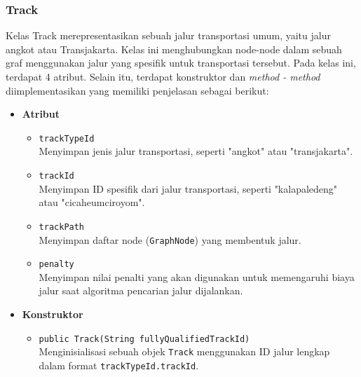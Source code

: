 \subsubsection{Track}
\label{subss:track}
Kelas Track merepresentasikan sebuah jalur transportasi umum, yaitu jalur angkot atau Transjakarta. Kelas ini menghubungkan node-node dalam sebuah graf menggunakan jalur yang spesifik untuk transportasi tersebut. Pada kelas ini, terdapat 4 atribut. Selain itu, terdapat konstruktor dan \textit{method - method} diimplementasikan yang memiliki penjelasan sebagai berikut:
\begin{itemize}
    \item \textbf{Atribut}
    \begin{itemize}
        \item \texttt{trackTypeId}
        \\ Menyimpan jenis jalur transportasi, seperti "angkot" atau "transjakarta".
        \item \texttt{trackId}
        \\ Menyimpan ID spesifik dari jalur transportasi, seperti "kalapaledeng" atau "cicaheumciroyom".
        \item \texttt{trackPath}
        \\ Menyimpan daftar node (\texttt{GraphNode}) yang membentuk jalur.
        \item \texttt{penalty}
        \\ Menyimpan nilai penalti yang akan digunakan untuk memengaruhi biaya jalur saat algoritma pencarian jalur dijalankan.
    \end{itemize}

    \item \textbf{Konstruktor}
    \begin{itemize}
        \item \texttt{public Track(String fullyQualifiedTrackId)}
        \\ Menginisialisasi sebuah objek \texttt{Track} menggunakan ID jalur lengkap dalam format \texttt{trackTypeId.trackId}.
    \end{itemize}


\end{itemize}
